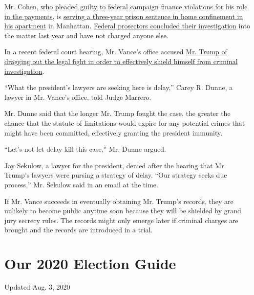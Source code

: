 Mr. Cohen,
\href{https://www.nytimes3xbfgragh.onion/2018/11/29/nyregion/michael-cohen-trump-russia-mueller.html}{who
pleaded guilty to federal campaign finance violations for his role in
the payments}, is
\href{https://www.nytimes3xbfgragh.onion/2020/07/23/nyregion/michael-cohen-trump-book.html}{serving
a three-year prison sentence in home confinement in his apartment} in
Manhattan.
\href{https://www.nytimes3xbfgragh.onion/2019/07/17/nyregion/michael-cohen-trump-investigation.html}{Federal
prosectors concluded their investigation} into the matter last year and
have not charged anyone else.

In a recent federal court hearing, Mr. Vance's office accused
\href{https://www.nytimes3xbfgragh.onion/2020/07/16/nyregion/donald-trump-taxes-cyrus-vance.html}{Mr.
Trump of dragging out the legal fight in order to effectively shield
himself from criminal investigation}.

``What the president's lawyers are seeking here is delay,'' Carey R.
Dunne, a lawyer in Mr. Vance's office, told Judge Marrero.

Mr. Dunne said that the longer Mr. Trump fought the case, the greater
the chance that the statute of limitations would expire for any
potential crimes that might have been committed, effectively granting
the president immunity.

``Let's not let delay kill this case,'' Mr. Dunne argued.

Jay Sekulow, a lawyer for the president, denied after the hearing that
Mr. Trump's lawyers were pursing a strategy of delay. ``Our strategy
seeks due process,'' Mr. Sekulow said in an email at the time.

If Mr. Vance succeeds in eventually obtaining Mr. Trump's records, they
are unlikely to become public anytime soon because they will be shielded
by grand jury secrecy rules. The records might only emerge later if
criminal charges are brought and the records are introduced in a trial.

\hypertarget{our-2020-election-guide}{%
\section{Our 2020 Election Guide}\label{our-2020-election-guide}}

Updated Aug. 3, 2020

